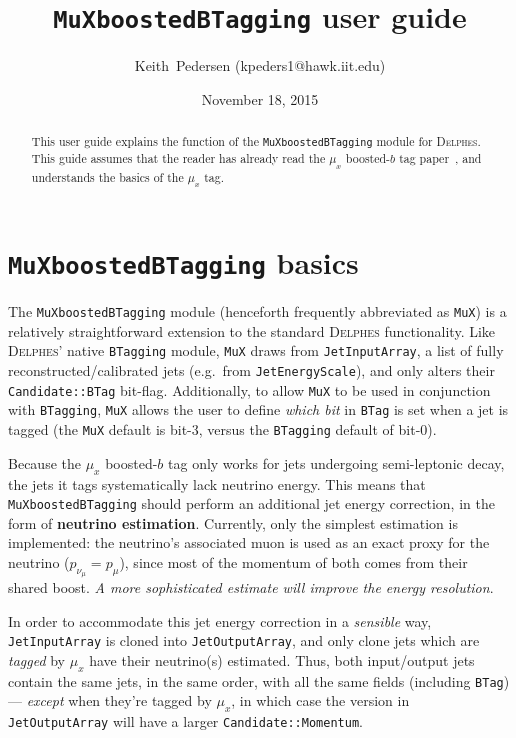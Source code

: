 \documentclass[10pt]{article}
\newcommand{\muX}{$\mu_{x}^{}$}
\newcommand{\muXmodFull}{\texttt{MuXboostedBTagging}}
\newcommand{\muXmod}{\texttt{MuX}}
\newcommand{\delphes}{\textsc{Delphes}}
\newcommand{\pMu}[1][]     {p_{\mu}^{#1}}
\newcommand{\pNu}[1][]     {p_{\nu_{\mu}}^{#1}}
\begin{document}
\title{{\muXmodFull} user guide}

\author{Keith~Pedersen (kpeders1@hawk.iit.edu)}

\date{November 18, 2015}

\maketitle

\begin{abstract}
This user guide explains the function of the {\muXmodFull} module for
{\delphes}. This guide assumes that the reader has already read the
{\muX} boosted-$b$ tag paper~\cite{Pedersen:MuX}, and understands the
basics of the {\muX} tag.
\end{abstract}

\section{{\muXmodFull} basics}
The {\muXmodFull} module (henceforth frequently abbreviated as {\muXmod})
is a relatively straightforward extension to the standard {\delphes}
functionality. Like {\delphes}' native \texttt{BTagging} module, {\muXmod}
draws from \texttt{JetInputArray}, a list of fully reconstructed/calibrated
jets (e.g.\ from \texttt{JetEnergyScale}), and only alters their
\texttt{Candidate::BTag} bit-flag. Additionally, to allow {\muXmod} to be used
in conjunction with \texttt{BTagging}, {\muXmod} allows the user to define
\emph{which bit} in \texttt{BTag} is set when a jet is tagged (the {\muXmod}
default is bit-3, versus the \texttt{BTagging} default of bit-0).

Because the {\muX} boosted-$b$ tag only works for jets undergoing
semi-leptonic decay, the jets it tags systematically lack neutrino energy.
This means that {\muXmodFull} should perform an additional jet energy
correction, in the form of \textbf{neutrino estimation}. Currently, only the
simplest estimation is implemented: the neutrino's associated muon is used as
an exact proxy for the neutrino ($\pNu=\pMu$), since most of the momentum of
both comes from their shared boost. \emph{A more sophisticated estimate will 
improve the energy resolution}.

In order to accommodate this jet energy correction in a \emph{sensible} way,\linebreak
\texttt{JetInputArray} is cloned into \texttt{JetOutputArray}, and
only clone jets which are \emph{tagged} by {\muX} have their neutrino(s)
estimated. Thus, both input/output jets contain the same jets, in the same
order, with all the same fields (including \texttt{BTag}) --- \emph{except} when
they're tagged by {\muX}, in which case the version in \texttt{JetOutputArray}
will have a larger \texttt{Candidate::Momentum}.
\end{document}
